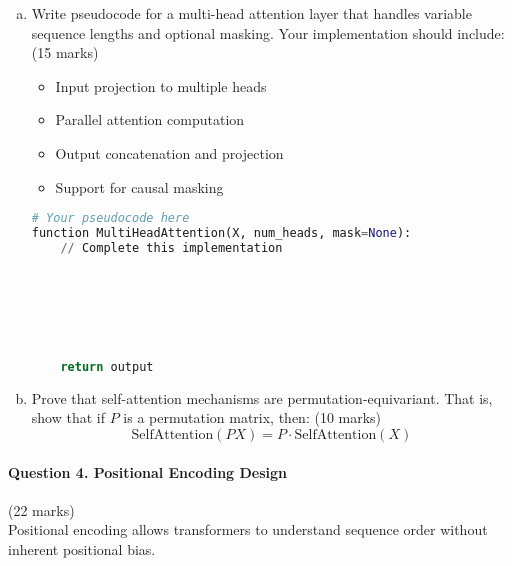 \documentclass[12pt]{article}
\newcommand{\longanswer}{\vspace{4cm}}           %
\newcommand{\codespace}{\vspace{5cm}}            %
\begin{document}
\begin{enumerate}[(a)]
    \item Write pseudocode for a multi-head attention layer that handles variable sequence lengths and optional masking. Your implementation should include: \hfill (15 marks)
    \begin{itemize}
        \item Input projection to multiple heads
        \item Parallel attention computation
        \item Output concatenation and projection
        \item Support for causal masking
    \end{itemize}
    
    \begin{lstlisting}[language=Python, basicstyle=\small, frame=single]
# Your pseudocode here
function MultiHeadAttention(X, num_heads, mask=None):
    // Complete this implementation
    
    
    
    
    
    
    
    return output
    \end{lstlisting}
    
    \codespace
    
    \item Prove that self-attention mechanisms are permutation-equivariant. That is, show that if $P$ is a permutation matrix, then: \hfill (10 marks)
    $$\text{SelfAttention}(PX) = P \cdot \text{SelfAttention}(X)$$
    
    \longanswer
\end{enumerate}

\newpage
\paragraph{Question 4. Positional Encoding Design}\hfill (22 marks)\\
Positional encoding allows transformers to understand sequence order without inherent positional bias.
\end{document}

